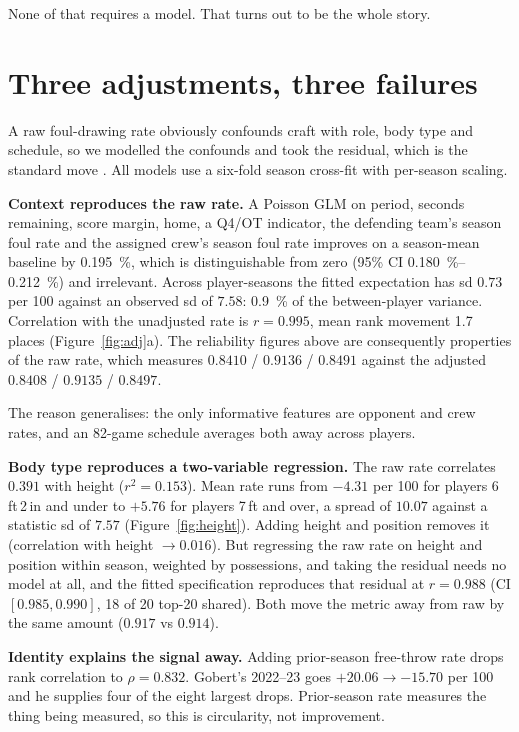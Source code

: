 \documentclass[10pt,letterpaper]{article}
\begin{document}
None of that requires a model. That turns out to be the whole story.

\section{Three adjustments, three failures}

A raw foul-drawing rate obviously confounds craft with role, body type and
schedule, so we modelled the confounds and took the residual, which is the
standard move \citep{decroos2019actions, cervone2016multiresolution}. All models
use a six-fold season cross-fit with per-season scaling.

\textbf{Context reproduces the raw rate.} A Poisson GLM on period, seconds
remaining, score margin, home, a Q4/OT indicator, the defending team's season
foul rate and the assigned crew's season foul rate improves on a season-mean
baseline by \SI{0.195}{\percent}, which is distinguishable from zero (95\% CI
\SI{0.180}{\percent}--\SI{0.212}{\percent}) and irrelevant. Across player-seasons
the fitted expectation has sd $0.73$ per 100 against an observed sd of $7.58$:
\SI{0.9}{\percent} of the between-player variance. Correlation with the
unadjusted rate is $r = 0.995$, mean rank movement 1.7 places
(Figure~\ref{fig:adj}a). The reliability figures above are consequently
properties of the raw rate, which measures $0.8410$ / $0.9136$ / $0.8491$ against
the adjusted $0.8408$ / $0.9135$ / $0.8497$.

The reason generalises: the only informative features are opponent and crew
rates, and an 82-game schedule averages both away across players.

\textbf{Body type reproduces a two-variable regression.} The raw rate correlates
$0.391$ with height ($r^2 = 0.153$). Mean rate runs from $-4.31$ per 100 for
players 6\,ft\,2\,in and under to $+5.76$ for players 7\,ft and over, a spread of
$10.07$ against a statistic sd of $7.57$ (Figure~\ref{fig:height}). Adding height
and position removes it (correlation with height $\to 0.016$). But regressing the
raw rate on height and position within season, weighted by possessions, and
taking the residual needs no model at all, and the fitted specification
reproduces that residual at $r = 0.988$ (CI $[0.985, 0.990]$, 18 of 20 top-20
shared). Both move the metric away from raw by the same amount ($0.917$ vs
$0.914$).

\textbf{Identity explains the signal away.} Adding prior-season free-throw rate
drops rank correlation to $\rho = 0.832$. Gobert's 2022--23 goes $+20.06 \to
-15.70$ per 100 and he supplies four of the eight largest drops. Prior-season
rate measures the thing being measured, so this is circularity, not improvement.
\end{document}
